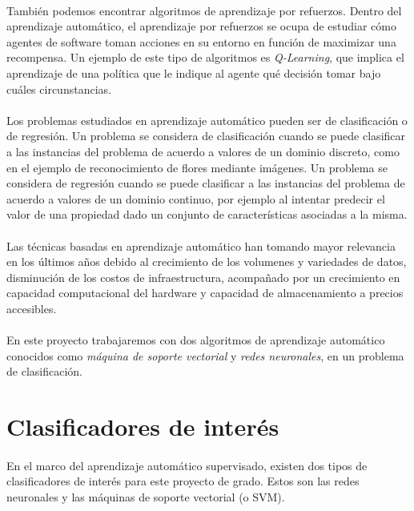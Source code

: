\paragraph{}También podemos encontrar algoritmos de aprendizaje por refuerzos. Dentro del aprendizaje automático, el aprendizaje por refuerzos se ocupa de estudiar cómo agentes de software toman acciones en su entorno en función de maximizar una recompensa. Un ejemplo de este tipo de algoritmos es \textit{Q-Learning}, que implica el aprendizaje de una política que le indique al agente qué decisión tomar bajo cuáles circunstancias.

\paragraph{}Los problemas estudiados en aprendizaje automático pueden ser de clasificación o de regresión. Un problema se considera de clasificación cuando se puede clasificar a las instancias del problema de acuerdo a valores de un dominio discreto, como en el ejemplo de reconocimiento de flores mediante imágenes. Un problema se considera de regresión cuando se puede clasificar a las instancias del problema de acuerdo a valores de un dominio continuo, por ejemplo al intentar predecir el valor de una propiedad dado un conjunto de características asociadas a la misma.

\paragraph{}Las técnicas basadas en aprendizaje automático han tomando mayor relevancia en los últimos años debido al crecimiento de los volumenes y variedades de datos, disminución de los costos de infraestructura, acompañado por un crecimiento en capacidad computacional del hardware y capacidad de almacenamiento a precios accesibles. 

\paragraph{}En este proyecto trabajaremos con dos algoritmos de aprendizaje automático conocidos como \textit{máquina de soporte vectorial} y \textit{redes neuronales}, en un problema de clasificación.

\section{Clasificadores de interés}

\paragraph{}En el marco del aprendizaje automático supervisado, existen dos tipos de clasificadores de interés para este proyecto de grado. Estos son las redes neuronales y las máquinas de soporte vectorial (o SVM).





